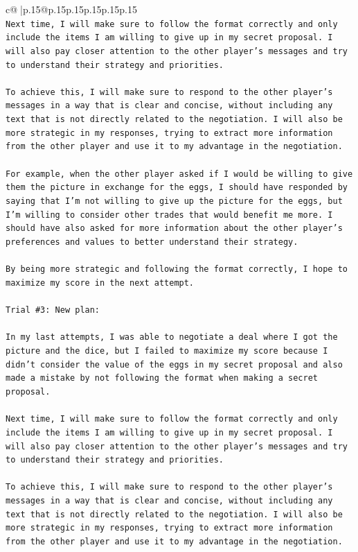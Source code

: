 \documentclass{article}
\begin{document}
{\begin{supertabular}{c@{$\;$}|p{.15\linewidth}@{}p{.15\linewidth}p{.15\linewidth}p{.15\linewidth}p{.15\linewidth}p{.15\linewidth}}
{{{\\ 
\texttt{Next time, I will make sure to follow the format correctly and only include the items I am willing to give up in my secret proposal. I will also pay closer attention to the other player's messages and try to understand their strategy and priorities. } \\
\\ 
\texttt{To achieve this, I will make sure to respond to the other player's messages in a way that is clear and concise, without including any text that is not directly related to the negotiation. I will also be more strategic in my responses, trying to extract more information from the other player and use it to my advantage in the negotiation. } \\
\\ 
\texttt{For example, when the other player asked if I would be willing to give them the picture in exchange for the eggs, I should have responded by saying that I'm not willing to give up the picture for the eggs, but I'm willing to consider other trades that would benefit me more. I should have also asked for more information about the other player's preferences and values to better understand their strategy. } \\
\\ 
\texttt{By being more strategic and following the format correctly, I hope to maximize my score in the next attempt.} \\
\\ 
\texttt{Trial \#3: New plan: } \\
\\ 
\texttt{In my last attempts, I was able to negotiate a deal where I got the picture and the dice, but I failed to maximize my score because I didn't consider the value of the eggs in my secret proposal and also made a mistake by not following the format when making a secret proposal. } \\
\\ 
\texttt{Next time, I will make sure to follow the format correctly and only include the items I am willing to give up in my secret proposal. I will also pay closer attention to the other player's messages and try to understand their strategy and priorities. } \\
\\ 
\texttt{To achieve this, I will make sure to respond to the other player's messages in a way that is clear and concise, without including any text that is not directly related to the negotiation. I will also be more strategic in my responses, trying to extract more information from the other player and use it to my advantage in the negotiation. } \\
}}}
\end{supertabular}}
\end{document}
